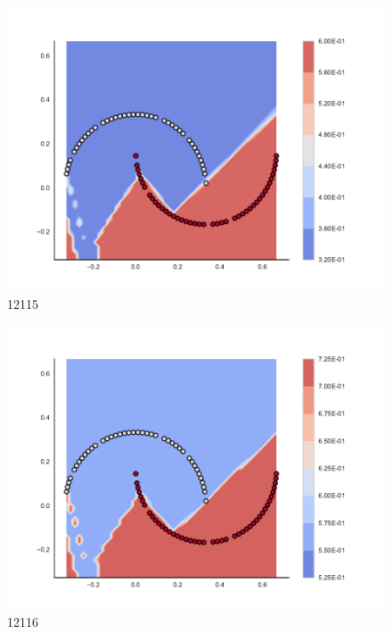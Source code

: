 \begin{subfigure}[b]{0.09\textwidth}
    \includegraphics[clip, trim=2.35cm 1.75cm 4.5cm 0cm,width=\textwidth]{img/convergence/12115.pdf}
    \caption{12115}
    \label{fig:convergence_12115}
\end{subfigure}
%
\begin{subfigure}[b]{0.09\textwidth}
    \includegraphics[clip, trim=2.35cm 1.75cm 4.5cm 0cm,width=\textwidth]{img/convergence/12116.pdf}
    \caption{12116}
    \label{fig:convergence_12116}
\end{subfigure}
%
